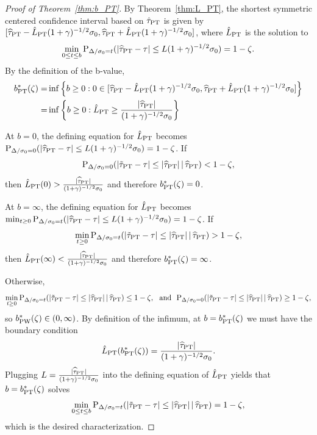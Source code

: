 \documentclass[11pt]{article}
\def\given{\,|\,}
\def\P{{\mathrm P}}
\newcommand{\htau}{\widehat\tau}
\numberwithin{equation}{section}
\theoremstyle{definition}
\begin{document}
\begin{proof}[Proof of Theorem~\ref{thm:b_PT}]

By Theorem~\ref{thm:L_PT}, the shortest symmetric centered confidence interval based on $\hat\tau_{\rm PT}$ is given by $[\htau_{\rm PT} - \hat{L}_{\rm PT} (1+\gamma)^{-1/2} \sigma_0, \htau_{\rm PT} + \hat{L}_{\rm PT} (1+\gamma)^{-1/2} \sigma_0]$, where $\hat{L}_{\rm PT}$ is the solution to
\begin{align*}
  \min_{0 \le t \le b}\P_{\Delta/\sigma_0 = t}(\lvert \htau_{\rm PT} - \tau \rvert \le L (1+\gamma)^{-1/2} \sigma_0) = 1-\zeta.
\end{align*}
By the definition of the b-value,
\begin{align*}
  b^*_{\rm PT}(\zeta) =& \inf\left\{b \ge 0: 0 \in [\htau_{\rm PT} - \hat{L}_{\rm PT} (1+\gamma)^{-1/2} \sigma_0, \htau_{\rm PT} + \hat{L}_{\rm PT} (1+\gamma)^{-1/2} \sigma_0]\right\}\\
  =& \inf\left\{b \ge 0: \hat{L}_{\rm PT} \ge \frac{\lvert \htau_{\rm PT} \rvert}{(1+\gamma)^{-1/2} \sigma_0}\right\}
\end{align*}

At $b=0$, the defining equation for $\hat{L}_{\rm PT}$ becomes $\P_{\Delta/\sigma_0 = 0}(\lvert \htau_{\rm PT} - \tau \rvert \le L (1+\gamma)^{-1/2} \sigma_0) = 1-\zeta$. If
\[
  \P_{\Delta/\sigma_0 = 0}(\lvert \tilde\tau_{\rm PT} - \tau \rvert \le \lvert \htau_{\rm PT} \rvert \given \htau_{\rm PT}) < 1-\zeta,
\]
then $\hat{L}_{\rm PT}(0) > \frac{\lvert \htau_{\rm PT} \rvert}{(1+\gamma)^{-1/2} \sigma_0}$ and therefore $b^*_{\rm PT}(\zeta)=0$.

At $b=\infty$, the defining equation for $\hat{L}_{\rm PT}$ becomes $\min_{t \ge 0}\P_{\Delta/\sigma_0 = t}(\lvert \htau_{\rm PT} - \tau \rvert \le L (1+\gamma)^{-1/2} \sigma_0) = 1-\zeta$. If
\[
  \min_{t \ge 0}\P_{\Delta/\sigma_0 = t}(\lvert \tilde\tau_{\rm PT} - \tau \rvert \le \lvert \htau_{\rm PT} \rvert \given \htau_{\rm PT}) > 1-\zeta,
\]
then $\hat{L}_{\rm PT}(\infty) < \frac{\lvert \htau_{\rm PT} \rvert}{(1+\gamma)^{-1/2} \sigma_0}$ and therefore $b^*_{\rm PT}(\zeta)=\infty$.

Otherwise,
\[
  \min_{t \ge 0}\P_{\Delta/\sigma_0 = t}(\lvert \tilde\tau_{\rm PT} - \tau \rvert \le \lvert \htau_{\rm PT} \rvert \given \htau_{\rm PT}) \le 1-\zeta,~~ {\rm and}~~ \P_{\Delta/\sigma_0 = 0}(\lvert \tilde\tau_{\rm PT} - \tau \rvert \le \lvert \htau_{\rm PT} \rvert \given \htau_{\rm PT}) \ge 1-\zeta,
\]
so $b^*_{\rm PW}(\zeta) \in (0, \infty)$. By definition of the infimum, at
$b=b^*_{\rm PT}(\zeta)$ we must have the boundary condition
\[
\hat L_{\rm PT}(b^*_{\rm PT}(\zeta))
=
\frac{\lvert \htau_{\rm PT} \rvert}{(1+\gamma)^{-1/2}\sigma_0}.
\]
Plugging $L=\frac{\lvert \htau_{\rm PT} \rvert}{(1+\gamma)^{-1/2} \sigma_0}$ into the defining equation of $\hat{L}_{\rm PT}$ yields that $b = b^*_{\rm PT}(\zeta)$ solves
\[
  \min_{0 \le t \le b} \P_{\Delta/\sigma_0 = t}(\lvert \tilde\tau_{\rm PT} - \tau \rvert \le \lvert \htau_{\rm PT} \rvert \given \htau_{\rm PT}) = 1-\zeta,
\]
which is the desired characterization.


\end{proof}
\end{document}
